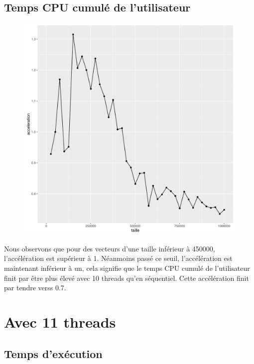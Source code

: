 \documentclass[a4paper,11pt]{scrartcl}
\begin{document}
\subsection{Temps CPU cumul\'e de l'utilisateur}
\begin{figure}[H] \center
   \includegraphics[scale=0.5] {graphes/temps_user_accel10.png}
\end{figure}
Nous observons que pour des vecteurs d'une taille inf\'erieur \`a 450000, l'acc\'el\'eration est sup\'erieur \`a 1. N\'eanmoins pass\'e ce seuil,  l'acc\'el\'eration est maintenant inf\'erieur \`a un, cela signifie que le temps CPU cumul\'e de l'utilisateur finit par \^{e}tre plus \'elev\'e avec 10 threads qu'en s\'equentiel. Cette acc\'el\'eration finit par tendre verss 0.7.


\section{Avec 11 threads}
\subsection{Temps d'ex\'ecution}
\end{document}
